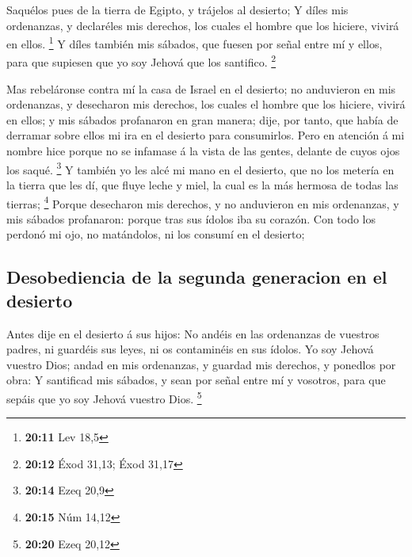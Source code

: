  Saquélos pues de la tierra de Egipto, y trájelos al
desierto;  Y díles mis ordenanzas, y declaréles mis
derechos, los cuales el hombre que los hiciere, vivirá en ellos.
\footnote{\textbf{20:11} Lev 18,5}  Y díles también mis
sábados, que fuesen por señal entre mí y ellos, para que supiesen que yo
soy Jehová que los santifico. \footnote{\textbf{20:12} Éxod 31,13; Éxod
  31,17}

 Mas rebeláronse contra mí la casa de Israel en el
desierto; no anduvieron en mis ordenanzas, y desecharon mis derechos,
los cuales el hombre que los hiciere, vivirá en ellos; y mis sábados
profanaron en gran manera; dije, por tanto, que había de derramar sobre
ellos mi ira en el desierto para consumirlos.  Pero en
atención á mi nombre hice porque no se infamase á la vista de las
gentes, delante de cuyos ojos los saqué. \footnote{\textbf{20:14} Ezeq
  20,9}  Y también yo les alcé mi mano en el desierto, que
no los metería en la tierra que les dí, que fluye leche y miel, la cual
es la más hermosa de todas las tierras; \footnote{\textbf{20:15} Núm
  14,12}  Porque desecharon mis derechos, y no anduvieron
en mis ordenanzas, y mis sábados profanaron: porque tras sus ídolos iba
su corazón.  Con todo los perdonó mi ojo, no matándolos, ni
los consumí en el desierto;

\hypertarget{desobediencia-de-la-segunda-generacion-en-el-desierto}{%
\subsection{Desobediencia de la segunda generacion en el
desierto}\label{desobediencia-de-la-segunda-generacion-en-el-desierto}}

 Antes dije en el desierto á sus hijos: No andéis en las
ordenanzas de vuestros padres, ni guardéis sus leyes, ni os contaminéis
en sus ídolos.  Yo soy Jehová vuestro Dios; andad en mis
ordenanzas, y guardad mis derechos, y ponedlos por obra:  Y
santificad mis sábados, y sean por señal entre mí y vosotros, para que
sepáis que yo soy Jehová vuestro Dios. \footnote{\textbf{20:20} Ezeq
  20,12}

